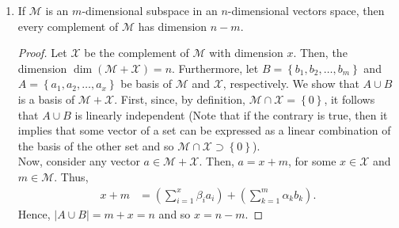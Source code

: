 \documentclass[12pt]{article}
\newcommand{\mf}[1]{\mathfrak{#1}}
\newcommand{\mc}[1]{\mathcal{#1}}
\newenvironment{problem}[2][Problem]{\begin{trivlist} \item[\hskip \labelsep {\bfseries #1}\hskip \labelsep {\bfseries #2.}]}{\end{trivlist}}
\begin{document}
\begin{problem}{6}
\begin{enumerate}
\begin{proof}
  Hence, $\mf{X}\cap\mf{B} = \mc{O}$, $\mf{B}\neq \mf{Y}$ and $\mf{B}+\mf{X} = \mc{V}$.
\end{proof}
  \item If $\mc{M}$ is an $m$-dimensional subspace in an $n$-dimensional vectors space, then every complement of $\mc{M}$ has dimension $n-m$.
\begin{proof}
  Let $\mc{X}$ be the complement of $\mc{M}$ with dimension $x$. Then, the dimension  $\dim(\mc{M}+\mc{X}) = n$. Furthermore, let $B = \left\{ b_{1},b_{2},\dots,b_{m} \right\}$ and $A=\left\{ a_{1},a_{2},\dots,a_{x} \right\}$ be basis of $\mc{M}$ and $\mc{X}$, respectively. We show that $A\cup B$ is a basis of $\mc{M}+\mc{X}$. First, since, by definition, $\mc{M}\cap \mc{X}=\left\{ 0 \right\}$, it follows that $A\cup B$ is linearly independent (Note that if the contrary is true, then it implies that some vector of a set can be expressed as a linear combination of the basis of the other set and so $\mc{M}\cap\mc{X} \supset \left\{ 0 \right\}$).\\
  Now, consider any vector $a\in \mc{M}+\mc{X}$. Then, $a=x+m$, for some $x\in \mc{X}$ and $m\in \mc{M}$. Thus,  
\begin{align*}
  x+m &= (\sum_{i=1}^{x}\beta_{i}a_{i})+(\sum_{k=1}^{m}\alpha_{k}b_{k}).
\end{align*}
Hence, $|A\cup B| = m+x=n$ and so $x=n-m$.
\end{proof}
\end{enumerate}
\end{problem}
\end{document}

